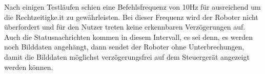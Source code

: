 Nach einigen Testläufen schien eine Befehlsfrequenz von 10Hz für ausreichend um die Rechtzeitigke.it zu gewährleisten. Bei dieser Frequenz wird der Roboter nicht überfordert und für den Nutzer treten keine erkennbaren Verzögerungen auf. Auch die Statusnachrichten kommen in diesem Intervall, es sei denn, es werden noch Bilddaten angehängt, dann sendet der Roboter ohne  Unterbrechungen, damit die Bilddaten möglichst verzögerungsfrei auf dem Steuergerät angezeigt werden können.                                                                                                                                                                                                                                                                                                                                                                                                                                                                                                                                                                                                                                                                                                                                                                                                                                                                                                                                                                                                                                                                                                                                                                                                                                                                                                                                                                                                                                                                                                                                                                                                                                                                                                                                                                                                                                                                                                                                                                                                                                                                                                                                                                                                                                                                                                                                                                                                                                                                                                                                                                                                                                                                                                                                                                                                                                                                                                                                                                         